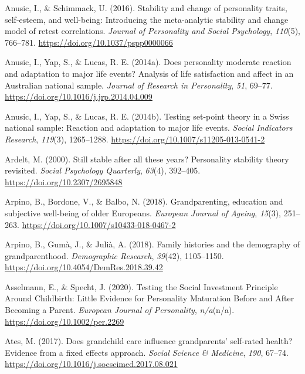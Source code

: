 \documentclass[
  english,
  man, noextraspace]{apa7}
\begin{document}
\hypertarget{refs}{}
\leavevmode\hypertarget{ref-anusicStabilityChangePersonality2016}{}%
Anusic, I., \& Schimmack, U. (2016). Stability and change of personality traits, self-esteem, and well-being: Introducing the meta-analytic stability and change model of retest correlations. \emph{Journal of Personality and Social Psychology}, \emph{110}(5), 766--781. \url{https://doi.org/10.1037/pspp0000066}

\leavevmode\hypertarget{ref-anusicDoesPersonalityModerate2014}{}%
Anusic, I., Yap, S., \& Lucas, R. E. (2014a). Does personality moderate reaction and adaptation to major life events? Analysis of life satisfaction and affect in an Australian national sample. \emph{Journal of Research in Personality}, \emph{51}, 69--77. \url{https://doi.org/10.1016/j.jrp.2014.04.009}

\leavevmode\hypertarget{ref-anusicTestingSetpointTheory2014}{}%
Anusic, I., Yap, S., \& Lucas, R. E. (2014b). Testing set-point theory in a Swiss national sample: Reaction and adaptation to major life events. \emph{Social Indicators Research}, \emph{119}(3), 1265--1288. \url{https://doi.org/10.1007/s11205-013-0541-2}

\leavevmode\hypertarget{ref-ardeltStillStableAll2000}{}%
Ardelt, M. (2000). Still stable after all these years? Personality stability theory revisited. \emph{Social Psychology Quarterly}, \emph{63}(4), 392--405. \url{https://doi.org/10.2307/2695848}

\leavevmode\hypertarget{ref-arpinoGrandparentingEducationSubjective2018}{}%
Arpino, B., Bordone, V., \& Balbo, N. (2018). Grandparenting, education and subjective well-being of older Europeans. \emph{European Journal of Ageing}, \emph{15}(3), 251--263. \url{https://doi.org/10.1007/s10433-018-0467-2}

\leavevmode\hypertarget{ref-arpinoFamilyHistoriesDemography2018}{}%
Arpino, B., Gumà, J., \& Julià, A. (2018). Family histories and the demography of grandparenthood. \emph{Demographic Research}, \emph{39}(42), 1105--1150. \url{https://doi.org/10.4054/DemRes.2018.39.42}

\leavevmode\hypertarget{ref-asselmannTestingSocialInvestment2020}{}%
Asselmann, E., \& Specht, J. (2020). Testing the Social Investment Principle Around Childbirth: Little Evidence for Personality Maturation Before and After Becoming a Parent. \emph{European Journal of Personality}, \emph{n/a}(n/a). \url{https://doi.org/10.1002/per.2269}

\leavevmode\hypertarget{ref-atesDoesGrandchildCare2017}{}%
Ates, M. (2017). Does grandchild care influence grandparents' self-rated health? Evidence from a fixed effects approach. \emph{Social Science \& Medicine}, \emph{190}, 67--74. \url{https://doi.org/10.1016/j.socscimed.2017.08.021}
\end{document}
